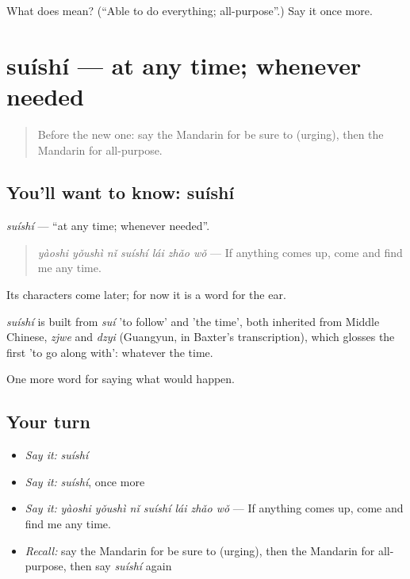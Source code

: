 \begin{tcolorbox}[breakable,colback=teal!4,colframe=teal!35!black,title={Before you move on}]
What does  mean? (\textquotedblleft{}Able to do everything; all-purpose\textquotedblright{}.) Say it once more.
\end{tcolorbox}
\section[suíshí]{suíshí — at any time; whenever needed}

\label{lesson:ZH-C393-suishi}



\begin{quote}
Before the new one: say the Mandarin for be sure to (urging), then the Mandarin for all-purpose.
\end{quote}

\subsection*{You'll want to know: suíshí}
\emph{suíshí} — \textquotedblleft{}at any time; whenever needed\textquotedblright{}.

\begin{quote}
\emph{yàoshi yǒushì nǐ suíshí lái zhǎo wǒ} — If anything comes up, come and find me any time.
\end{quote}

Its characters come later; for now it is a word for the ear.

\begin{cousinweb}
\emph{suíshí} is built from \emph{suí} 'to follow' and  'the time', both inherited from Middle Chinese, \emph{zjwe} and \emph{dzyi} (Guangyun, in Baxter's transcription), which glosses the first 'to go along with': whatever the time.
\end{cousinweb}

\begin{grammarlens}[title={What you've built}]
One more word for saying what would happen.
\end{grammarlens}

\subsection*{Your turn}
\begin{itemize}
\raggedright
  \item \emph{Say it:} \emph{suíshí}
  \item \emph{Say it:} \emph{suíshí}, once more
  \item \emph{Say it:} \emph{yàoshi yǒushì nǐ suíshí lái zhǎo wǒ} — If anything comes up, come and find me any time.
  \item \emph{Recall:} say the Mandarin for be sure to (urging), then the Mandarin for all-purpose, then say \emph{suíshí} again
\end{itemize}

